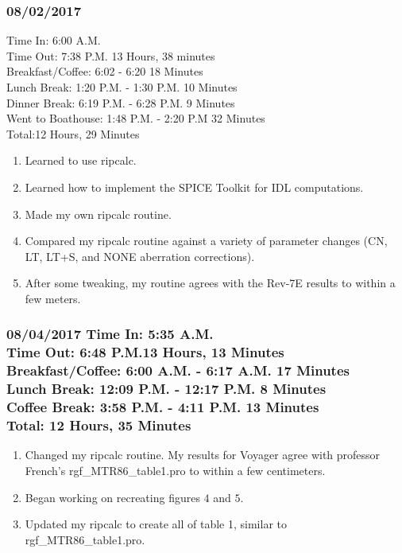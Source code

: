 \documentclass[crop=false,class=book]{standalone}
\begin{document}
\subsubsection{\footnotesize 08/02/2017}
Time In: 6:00 A.M.\\
Time Out: 7:38 P.M. \hfill 13 Hours, 38 minutes\\
Breakfast/Coffee: 6:02 - 6:20 \hfill 18 Minutes\\
Lunch Break: 1:20 P.M. - 1:30 P.M. \hfill 10 Minutes\\
Dinner Break: 6:19 P.M. - 6:28 P.M. \hfill 9 Minutes\\
Went to Boathouse: 1:48 P.M. - 2:20 P.M \hfill 32 Minutes\\
Total:\hfill 12 Hours, 29 Minutes
\begin{enumerate}
    \item Learned to use ripcalc.
    \item Learned how to implement the SPICE Toolkit for IDL computations.
    \item Made my own ripcalc routine.
    \item Compared my ripcalc routine against a variety of parameter changes (CN, LT, LT+S, and NONE aberration corrections).
    \item After some tweaking, my routine agrees with the Rev-7E results to within a few meters.
\end{enumerate}
\subsubsection{\footnotesize 08/04/2017
Time In: 5:35 A.M.\\
Time Out: 6:48 P.M.\hfill 13 Hours, 13 Minutes\\
Breakfast/Coffee: 6:00 A.M. - 6:17 A.M. \hfill 17 Minutes\\
Lunch Break: 12:09 P.M. - 12:17 P.M. \hfill 8 Minutes\\
Coffee Break: 3:58 P.M. - 4:11 P.M. \hfill 13 Minutes\\
Total: \hfill 12 Hours, 35 Minutes}
\begin{enumerate}
    \item Changed my ripcalc routine. My results for Voyager agree with professor French's rgf\_MTR86\_table1.pro to within a few centimeters.
    \item Began working on recreating figures $4$ and $5$.
    \item Updated my ripcalc to create all of table 1, similar to rgf\_MTR86\_table1.pro.
\end{enumerate}
\end{document}
